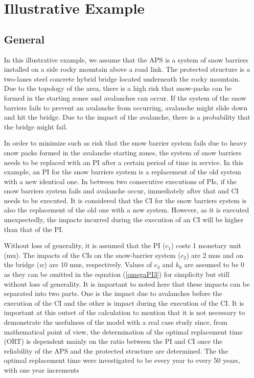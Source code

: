 \documentclass[]{article}
\begin{document}
\section{Illustrative Example}

\label{sec3} %

\subsection{General}
In this illustrative example, we assume that the APS is a system of snow barriers installed on
a side rocky mountain above a road link. The protected structure
is a two-lanes steel concrete hybrid bridge located underneath the
rocky mountain. Due to the topology of the area, there is a high risk
that snow-packs can be formed in the starting zones and avalanches
can occur. If the system of the snow barriers fails to prevent an
avalanche from occurring, avalanche might slide down and hit the bridge.
Due to the impact of the avalanche, there is a probability that the
bridge might fail.

In order to minimize such as risk that the snow barrier system fails
due to heavy snow packs formed in the avalanche starting zones, the
system of snow barriers needs to be replaced with an PI after a certain
period of time in service. In this example, an PI for the snow barriers
system is a replacement of the old system with a new identical one.
In between two consecutive executions of PIs, if the snow barriers
system fails and avalanche occur, immediately after that and CI needs
to be executed. It is considered that the CI for the snow barriers
system is also the replacement of the old one with a new system. However,
as it is executed unexpectedly, the impacts incurred during the execution
of an CI will be higher than that of the PI.

Without loss of generality, it is assumed that the PI ($c_1$) costs 1 monetary
unit (mu). The impacts of the CIs on the snow-barrier system ($c_2$) are 2
mus and on the bridge ($w$) are 10 mus, respectively. Values of $c_3$ and $k_0$ are assumed to be 0 as they can be omitted in the equation (\ref{omegaPI3}) for simplicity but still without loss of generality. It is important to
noted here that these impacts can be separated into two parts. One
is the impact due to avalanches before the execution of the CI and
the other is impact during the execution of the CI. It is important
at this outset of the calculation to mention that it is not necessary
to demonstrate the usefulness of the model with a real case study
since, from mathematical point of view, the determination of the optimal
replacement time (ORT) is dependent mainly on the ratio between
the PI and CI once the reliability of the APS and the protected structure are determined.
The the optimal replacement time were investigated to be every year
to every 50 years, with one year increments 
\end{document}
